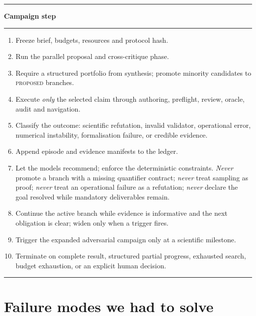 \documentclass[11pt,a4paper]{article}
\begin{document}
\begin{center}
\begin{minipage}{0.93\textwidth}
\small
\hrule\vspace{3pt}
\textbf{Campaign step}\vspace{2pt}
\hrule\vspace{4pt}
\begin{enumerate}[leftmargin=1.4em,itemsep=1pt]
  \item Freeze brief, budgets, resources and protocol hash.
  \item Run the parallel proposal and cross-critique phase.
  \item Require a structured portfolio from synthesis; promote minority
        candidates to \textsc{proposed} branches.
  \item Execute \emph{only} the selected claim through authoring, preflight,
        review, oracle, audit and navigation.
  \item Classify the outcome: scientific refutation, invalid validator,
        operational error, numerical instability, formalisation failure, or
        credible evidence.
  \item Append episode and evidence manifests to the ledger.
  \item Let the models recommend; enforce the deterministic constraints.
        \emph{Never} promote a branch with a missing quantifier contract;
        \emph{never} treat sampling as proof; \emph{never} treat an operational
        failure as a refutation; \emph{never} declare the goal resolved while
        mandatory deliverables remain.
  \item Continue the active branch while evidence is informative and the next
        obligation is clear; widen only when a trigger fires.
  \item Trigger the expanded adversarial campaign only at a scientific
        milestone.
  \item Terminate on complete result, structured partial progress, exhausted
        search, budget exhaustion, or an explicit human decision.
\end{enumerate}
\vspace{2pt}\hrule
\end{minipage}
\end{center}

\section{Failure modes we had to solve}
\label{sec:failures}
\end{document}
